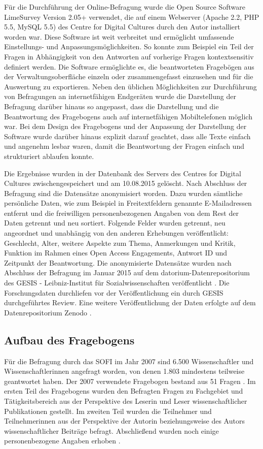 Für die Durchführung der Online-Befragung wurde die Open Source Software LimeSurvey Version 2.05+ verwendet, die auf einem Webserver (Apache 2.2, PHP 5.5, MySQL 5.5) des Centre for Digital Cultures durch den Autor installiert worden war. Diese Software ist weit verbreitet und ermöglicht umfassende Einstellungs- und Anpassungsmöglichkeiten. So konnte zum Beispiel ein Teil der Fragen in Abhängigkeit von den Antworten auf vorherige Fragen kontextsensitiv definiert werden. Die Software ermöglichte es, die beantworteten Fragebögen aus der Verwaltungsoberfläche einzeln oder zusammengefasst einzusehen und für die Auswertung zu exportieren. Neben den üblichen Möglichkeiten zur Durchführung von Befragungen an internetfähigen Endgeräten wurde die Darstellung der Befragung darüber hinaus so angepasst, dass die Darstellung und die Beantwortung des Fragebogens auch auf internetfähigen Mobiltelefonen möglich war. Bei dem Design des Fragebogens und der Anpassung der Darstellung der Software wurde darüber hinaus explizit darauf geachtet, dass alle Texte einfach und angenehm lesbar waren, damit die Beantwortung der Fragen einfach und strukturiert ablaufen konnte.

Die Ergebnisse wurden in der Datenbank des Servers des Centres for Digital Cultures zwischengespeichert und am 10.08.2015 gelöscht. Nach Abschluss der Befragung sind die Datensätze anonymisiert worden. Dazu wurden sämtliche persönliche Daten, wie zum Beispiel in Freitextfeldern genannte E-Mailadressen entfernt und die freiwilligen personenbezogenen Angaben von dem Rest der Daten getrennt und neu sortiert. Folgende Felder wurden getrennt, neu angeordnet und unabhängig von den anderen Erhebungen veröffentlicht: Geschlecht, Alter, weitere Aspekte zum Thema, Anmerkungen und Kritik, Funktion im Rahmen eines Open Access Engagements, Antwort ID und Zeitpunkt der Beantwortung. Die anonymisierte Datensätze wurden nach Abschluss der Befragung im Januar 2015 auf dem datorium-Datenrepositorium des GESIS - Leibniz-Institut für Sozialwissenschaften veröffentlicht \cite{heise_2015_os_data_gesis}. Die Forschungsdaten durchliefen vor der Veröffentlichung ein durch GESIS durchgeführtes Review. Eine weitere Veröffentlichung der Daten erfolgte auf dem Datenrepositorium Zenodo \cite{heise_2015_os_data_zenodo}.

\subsection{Aufbau des Fragebogens}

Für die Befragung durch das SOFI im Jahr 2007 sind 6.500 Wissenschaftler und Wissenschaftlerinnen angefragt worden, von denen 1.803 mindestens teilweise geantwortet haben. Der 2007 verwendete Fragebogen bestand aus 51 Fragen  \cite{Hanekop_Wittke_2007_Fragebogen}. Im ersten Teil des Fragebogens wurden den Befragten Fragen zu Fachgebiet und Tätigkeitsbereich aus der Perspektive des Leserin und Leser wissenschaftlicher Publikationen gestellt. Im zweiten Teil wurden die Teilnehmer und Teilnehmerinnen aus der Perspektive der Autorin beziehungsweise des Autors wissenschaftlicher Beiträge befragt. Abschließend wurden noch einige personenbezogene Angaben erhoben \cite{Hanekop_Wittke_2007_Fragebogen}.

